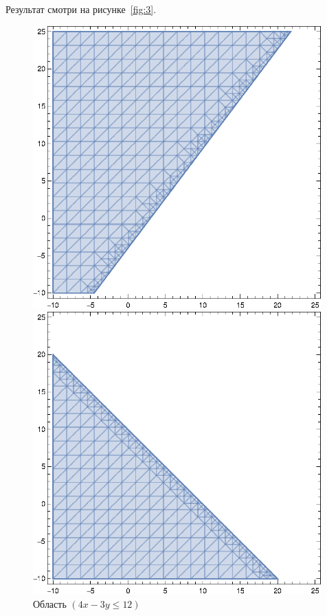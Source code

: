 Результат смотри на рисунке~\ref{fig:3}.

\begin{figure}[!htb]\centering
  \begin{minipage}{0.32\textwidth}
    \centering

    \includegraphics[width=0.99\textwidth]
    {inc/1.eps}
  
    \caption{Область $(4x-3y\leq 12)$}

    \label{fig:1}
  \end{minipage}
  \begin{minipage}{0.32\textwidth}
    \centering

    \includegraphics[width=0.99\textwidth]
    {inc/2.eps}
  

\end{minipage}
\end{figure}
